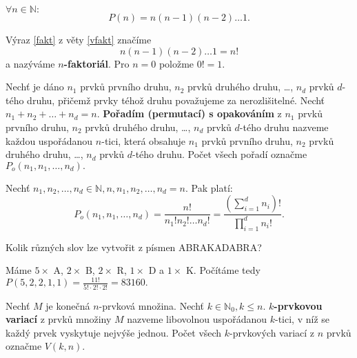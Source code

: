 \begin{veta}\label{vfakt}
    $\forall n \in \mathbb N:$
    \begin{equation}\label{fakt}
   P(n)=n(n-1)(n-2)\dots 1.
    \end{equation}
\end{veta}

\begin{definition}
    Výraz \ref{fakt} z věty \ref{vfakt} značíme
    $$n(n-1)(n-2)\dots 1=n!$$
    a nazýváme \textbf{$n$-faktoriál}. Pro $n=0$ položme $0! =1.$
\end{definition}

\begin{definition}
    Nechť je dáno $n_1$ prvků prvního druhu, $n_2$ prvků druhého druhu, \dots,
    $n_d$ prvků $d$-tého druhu, přičemž prvky téhož druhu považujeme za nerozlišitelné.
    Nechť $n_1+n_2+\dots+n_d=n.$ \textbf{Pořadím (permutací) s opakováním} z  $n_1$
    prvků prvního druhu, $n_2$ prvků druhého druhu, \dots, $n_d$ prvků $d$-tého druhu
    nazveme každou uspořádanou $n$-tici, která obsahuje $n_1$ prvků prvního druhu,
    $n_2$ prvků druhého druhu, \dots, $n_d$ prvků $d$-tého druhu. Počet všech pořadí
    označme $P_o(n_1, n_1, \dots, n_d).$
\end{definition}

\begin{veta}
    Nechť $n_1, n_2, \dots, n_d \in \mathbb N, n, n_1, n_2, \dots, n_d=n.$ Pak platí:
    $$P_o(n_1, n_1, \dots, n_d)=\frac{n!}{n_1!n_2!\dots n_d!}=
    \frac{\left ( \sum_{i=1}^d n_i \right )! }{\prod_{i=1}^d n_i!}.$$
\end{veta}

\begin{priklad}
Kolik různých slov lze vytvořit z písmen ABRAKADABRA?
\end{priklad}

\begin{reseni}
Máme $5\times$ A, $2\times $ B, $2\times$ R, $1\times$ D a $1\times $ K.
Počítáme tedy $P(5,2,2,1,1)=\frac{11!}{5!\cdot 2!\cdot 2!}=83160.$
\end{reseni}

\begin{definition}
    Nechť $M$ je konečná $n$-prvková množina. Nechť $k \in \mathbb N_0, k\leq n.$
    \textbf{$k$-prvkovou variací} z prvků množiny $M$ nazveme libovolnou
    uspořádanou $k$-tici, v níž se každý prvek vyskytuje nejvýše jednou. Počet
    všech $k$-prvkových variací z $n$ prvků označme $V(k,n).$
\end{definition}

